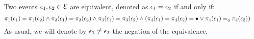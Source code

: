 %
\begin{defn}
  Two events $\mathtt{\epsilon}_1, \mathtt{\epsilon}_2 \in \mathcal{E}$ are equivalent, 
  denoted as $\mathtt{\epsilon}_1 = \mathtt{\epsilon}_2$ 
  if and only if:
  \[
    \pi_1(\mathtt{\epsilon}_1) = \pi_1(\mathtt{\epsilon}_2) 
    \land  
    \pi_2(\mathtt{\epsilon}_1) = \pi_2(\mathtt{\epsilon}_2) 
    \land
    \pi_{3}(\mathtt{\epsilon}_1) = \pi_{3}(\mathtt{\epsilon}_2)
    \land 
    (\pi_{4}(\mathtt{\epsilon}_1) = \pi_{4}(\mathtt{\epsilon}_2) = \bullet
    \lor \pi_{4}(\mathtt{\epsilon}_1) =_q \pi_{4}(\mathtt{\epsilon}_2))
    \]
  As usual, we will denote by $\mathtt{\epsilon}_1 \neq \mathtt{\epsilon}_2$  the negation of the equivalence.
\end{defn}